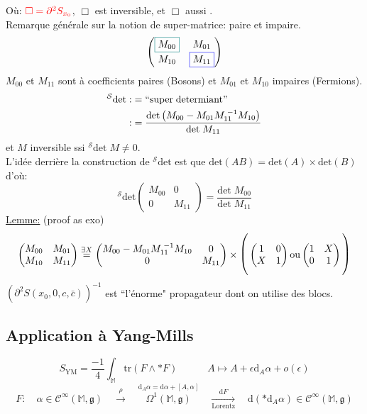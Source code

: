 \documentclass[a4paper,11pt]{article}
\renewcommand{\d}{{\mathrm{d}}}
\begin{document}
Où: $\color{red}\Box=\partial^2 S_{x_0}$, \color{teal}$\Box$ est inversible\color{black},
et \color{blue} $\Box$ aussi \color{black}.\\
Remarque générale sur la notion de super-matrice: \color{teal} paire
\color{black} et \color{blue} impaire\color{black}.
$$\left(\begin{matrix}
	\color{teal}\boxed{\color{black}M_{00}} & M_{01}\\
	M_{10} & \color{blue}\boxed{\color{black}M_{11}}
\end{matrix}\right)$$
$M_{00}$ et $M_{11}$ sont à coefficients paires (Bosons) et $M_{01}$ et $M_{10}$ impaires (Fermions). 
\begin{align*}
^\mathcal{S}\mathrm{det} :&= ``\mathrm{super}\;\mathrm{determiant}"\\
:&=\frac{\mathrm{det}\left(M_{00}-M_{01}M_{11}^{\;-1}M_{10}\right)}{\mathrm{det}\;M_{11}}
\end{align*}
et $M$ inversible ssi $^\mathcal{S}\mathrm{det}\;M \ne 0$.\\L'idée derrière la construction de $^\mathcal{S}\mathrm{det}$ est que $\mathrm{det}(AB)=\mathrm{det}(A)\times\mathrm{det}(B)$ d'où: $$^\mathcal{S}\mathrm{det} \left(\begin{matrix}
M_{00}&0\\0&M_{11}
\end{matrix}\right) = \frac{\mathrm{det}\; M_{00}}{\mathrm{det}\; M_{11}}$$
\underline{Lemme:} (proof as exo)
$$\left(\begin{matrix}
M_{00} & M_{01}\\
M_{10} & M_{11}
\end{matrix}\right)
\overset{\exists X}=
\left(\begin{matrix}
M_{00}-M_{01}M_{11}^{\;-1}M_{10} & 0\\
0 & M_{11}
\end{matrix}\right)
\times
\mathlarger{\mathlarger{\Bigg(}}\left(\begin{matrix}
1 & 0\\ X & 1
\end{matrix}\right)
\mathrm{ou}
\left(\begin{matrix}
1 & X\\ 0 & 1
\end{matrix}\right)\mathlarger{\mathlarger{\Bigg)}}
$$
$\left(\partial^2S(x_0,0,c,\bar c)\right)^{-1}$ est ``l'énorme" propagateur dont on utilise des blocs.

\subsection{Application à Yang-Mills}
$$S_\mathrm{YM}= \frac{-1}4 \int_\mathbb{M}\mathrm{tr}(F\wedge*F)\quad\quad\quad A\mapsto A+\epsilon\d_A\alpha + o(\epsilon)$$
$$F: \quad \alpha \in \mathcal{C}^\infty(\mathbb{M},\mathfrak{g}) \quad \overset\rho\longrightarrow\quad  \overset{\d_A\alpha = \d\alpha+[A,\alpha]}{\Omega^1(\mathbb{M},\mathfrak{g})} \quad \underset{\mathrm{Lorentz}}{\overset{\d F}\longrightarrow} \quad \d(*\d_A\alpha)\in \mathcal{C}^\infty(\mathbb{M},\mathfrak{g})$$
\end{document}
